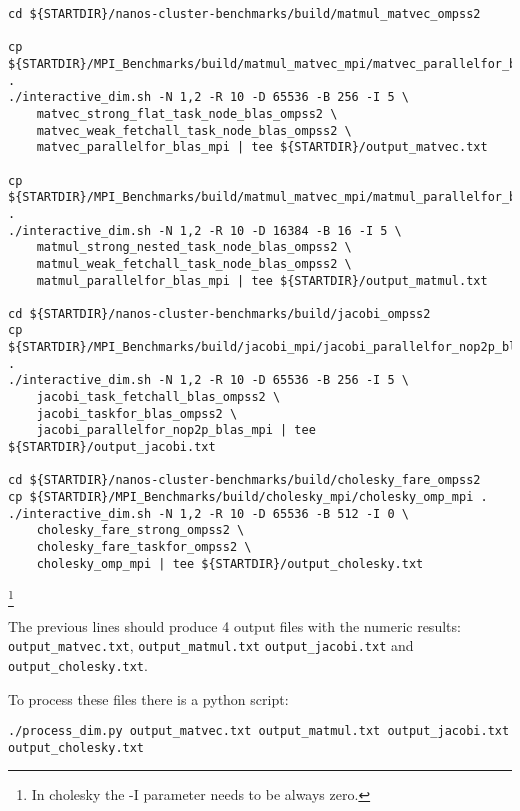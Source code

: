 \documentclass{article}
\newcommand{\code}[1]{\texttt{#1}}
\begin{document}
\begin{lstlisting}
cd ${STARTDIR}/nanos-cluster-benchmarks/build/matmul_matvec_ompss2

cp ${STARTDIR}/MPI_Benchmarks/build/matmul_matvec_mpi/matvec_parallelfor_blas_mpi .
./interactive_dim.sh -N 1,2 -R 10 -D 65536 -B 256 -I 5 \
	matvec_strong_flat_task_node_blas_ompss2 \
	matvec_weak_fetchall_task_node_blas_ompss2 \
	matvec_parallelfor_blas_mpi | tee ${STARTDIR}/output_matvec.txt

cp ${STARTDIR}/MPI_Benchmarks/build/matmul_matvec_mpi/matmul_parallelfor_blas_mpi .
./interactive_dim.sh -N 1,2 -R 10 -D 16384 -B 16 -I 5 \
	matmul_strong_nested_task_node_blas_ompss2 \
	matmul_weak_fetchall_task_node_blas_ompss2 \
	matmul_parallelfor_blas_mpi | tee ${STARTDIR}/output_matmul.txt

cd ${STARTDIR}/nanos-cluster-benchmarks/build/jacobi_ompss2
cp ${STARTDIR}/MPI_Benchmarks/build/jacobi_mpi/jacobi_parallelfor_nop2p_blas_mpi .
./interactive_dim.sh -N 1,2 -R 10 -D 65536 -B 256 -I 5 \
	jacobi_task_fetchall_blas_ompss2 \
	jacobi_taskfor_blas_ompss2 \
	jacobi_parallelfor_nop2p_blas_mpi | tee ${STARTDIR}/output_jacobi.txt

cd ${STARTDIR}/nanos-cluster-benchmarks/build/cholesky_fare_ompss2
cp ${STARTDIR}/MPI_Benchmarks/build/cholesky_mpi/cholesky_omp_mpi .
./interactive_dim.sh -N 1,2 -R 10 -D 65536 -B 512 -I 0 \
	cholesky_fare_strong_ompss2 \
	cholesky_fare_taskfor_ompss2 \
	cholesky_omp_mpi | tee ${STARTDIR}/output_cholesky.txt
\end{lstlisting}

\footnote{In cholesky the -I parameter needs to be always zero.}

The previous lines should produce 4 output files with the numeric
results: \code{output\_matvec.txt}, \code{output\_matmul.txt}
\code{output\_jacobi.txt} and \code{output\_cholesky.txt}.

To process these files there is a python script:

\begin{lstlisting}
./process_dim.py output_matvec.txt output_matmul.txt output_jacobi.txt output_cholesky.txt
\end{lstlisting}
\end{document}
